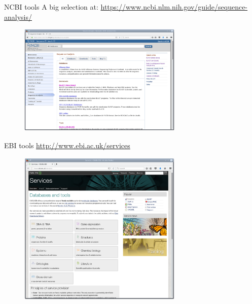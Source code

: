 \documentclass[pdf]{beamer}
\begin{document}
\begin{frame}{NCBI tools}
  A big selection at:
  \url{https://www.ncbi.nlm.nih.gov/guide/sequence-analysis/}
  \begin{figure}[ht]
    \includegraphics[width=0.7\textwidth]{images/ncbi_tools}
  \end{figure}
\end{frame}

\begin{frame}{EBI tools}
  \url{http://www.ebi.ac.uk/services}
  \begin{figure}[ht]
    \includegraphics[width=0.7\textwidth]{images/ebi_tools1}
  \end{figure}
\end{frame}
\end{document}

